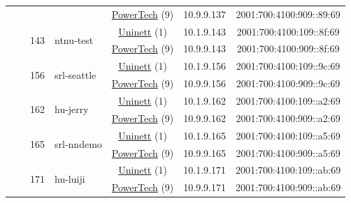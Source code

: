 \begin{small}
\begin{center}
\begin{longtable}{|c|c|c|c|c|c|c|c|}
  &  &  &  & \multicolumn{2}{|c|}{\tiny{\href{http://www.powertech.no}{PowerTech} (9)}} & \tiny{10.9.9.137} & \tiny{2001:700:4100:909::89:69} \\* \cline{3-3}\cline{4-4}\cline{5-5}\cline{6-6}\cline{7-7}\cline{8-8}
  &  & \multirow{2}{*}{\tiny{143}} & \multicolumn{1}{|l|}{\multirow{2}{*}{\tiny{ntnu-test}}} & \multicolumn{2}{|c|}{\tiny{\href{https://www.uninett.no}{Uninett} (1)}} & \tiny{10.1.9.143} & \tiny{2001:700:4100:109::8f:69} \\* \cline{5-5}\cline{6-6}\cline{7-7}\cline{8-8}
  &  &  &  & \multicolumn{2}{|c|}{\tiny{\href{http://www.powertech.no}{PowerTech} (9)}} & \tiny{10.9.9.143} & \tiny{2001:700:4100:909::8f:69} \\* \cline{3-3}\cline{4-4}\cline{5-5}\cline{6-6}\cline{7-7}\cline{8-8}
  &  & \multirow{2}{*}{\tiny{156}} & \multicolumn{1}{|l|}{\multirow{2}{*}{\tiny{srl-seattle}}} & \multicolumn{2}{|c|}{\tiny{\href{https://www.uninett.no}{Uninett} (1)}} & \tiny{10.1.9.156} & \tiny{2001:700:4100:109::9c:69} \\* \cline{5-5}\cline{6-6}\cline{7-7}\cline{8-8}
  &  &  &  & \multicolumn{2}{|c|}{\tiny{\href{http://www.powertech.no}{PowerTech} (9)}} & \tiny{10.9.9.156} & \tiny{2001:700:4100:909::9c:69} \\* \cline{3-3}\cline{4-4}\cline{5-5}\cline{6-6}\cline{7-7}\cline{8-8}
  &  & \multirow{2}{*}{\tiny{162}} & \multicolumn{1}{|l|}{\multirow{2}{*}{\tiny{hu-jerry}}} & \multicolumn{2}{|c|}{\tiny{\href{https://www.uninett.no}{Uninett} (1)}} & \tiny{10.1.9.162} & \tiny{2001:700:4100:109::a2:69} \\* \cline{5-5}\cline{6-6}\cline{7-7}\cline{8-8}
  &  &  &  & \multicolumn{2}{|c|}{\tiny{\href{http://www.powertech.no}{PowerTech} (9)}} & \tiny{10.9.9.162} & \tiny{2001:700:4100:909::a2:69} \\* \cline{3-3}\cline{4-4}\cline{5-5}\cline{6-6}\cline{7-7}\cline{8-8}
  &  & \multirow{2}{*}{\tiny{165}} & \multicolumn{1}{|l|}{\multirow{2}{*}{\tiny{srl-nndemo}}} & \multicolumn{2}{|c|}{\tiny{\href{https://www.uninett.no}{Uninett} (1)}} & \tiny{10.1.9.165} & \tiny{2001:700:4100:109::a5:69} \\* \cline{5-5}\cline{6-6}\cline{7-7}\cline{8-8}
  &  &  &  & \multicolumn{2}{|c|}{\tiny{\href{http://www.powertech.no}{PowerTech} (9)}} & \tiny{10.9.9.165} & \tiny{2001:700:4100:909::a5:69} \\* \cline{3-3}\cline{4-4}\cline{5-5}\cline{6-6}\cline{7-7}\cline{8-8}
  &  & \multirow{2}{*}{\tiny{171}} & \multicolumn{1}{|l|}{\multirow{2}{*}{\tiny{hu-luiji}}} & \multicolumn{2}{|c|}{\tiny{\href{https://www.uninett.no}{Uninett} (1)}} & \tiny{10.1.9.171} & \tiny{2001:700:4100:109::ab:69} \\* \cline{5-5}\cline{6-6}\cline{7-7}\cline{8-8}
  &  &  &  & \multicolumn{2}{|c|}{\tiny{\href{http://www.powertech.no}{PowerTech} (9)}} & \tiny{10.9.9.171} & \tiny{2001:700:4100:909::ab:69} \\ \hline
\end{longtable}
\end{center}
\end{small}



